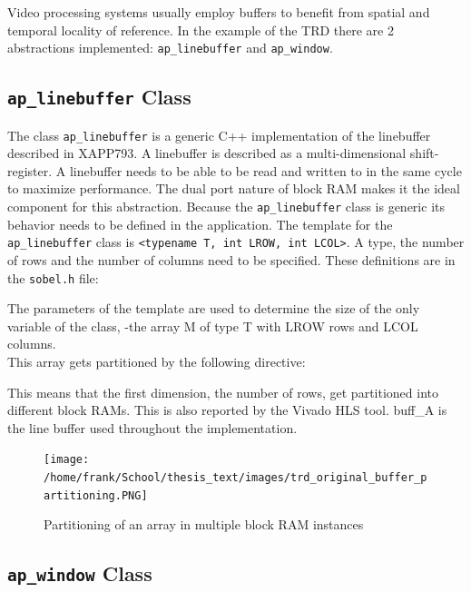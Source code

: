 Video processing systems usually employ buffers to benefit from spatial and temporal locality of reference. In the example of the TRD there are 2 abstractions implemented: \texttt{ap\_linebuffer} and \texttt{ap\_window}.

\subsection{\texttt{ap\_linebuffer} Class}

The class \texttt{ap\_linebuffer} is a generic C++ implementation of the linebuffer described in XAPP793. A linebuffer is described as a multi-dimensional shift-register. A linebuffer needs to be able to be read and written to in the same cycle to maximize performance. The dual port nature of block RAM makes it the ideal component for this abstraction.
Because the \texttt{ap\_linebuffer} class is generic its behavior needs to be defined in the application. The template for the \texttt{ap\_linebuffer} class is \texttt{<typename T, int LROW, int LCOL>}. A type, the number of rows and the number of columns need to be specified. These definitions are in the \texttt{sobel.h} file:




The parameters of the template are used to determine the size of the only variable of the class, -the array M of type T with LROW rows and LCOL columns.\\
This array gets partitioned by the following directive:



This means that the first dimension, the number of rows, get partitioned into different block RAMs. This is also reported by the Vivado HLS tool. buff\_A is the line buffer used throughout the implementation.\\

\medskip

\begin{figure}[h]
\centering
\texttt{[image: /home/frank/School/thesis\_text/images/trd\_original\_buffer\_partitioning.PNG]} 
\caption{Partitioning of an array in multiple block RAM instances}
\end{figure}


\subsection{\texttt{ap\_window} Class}

